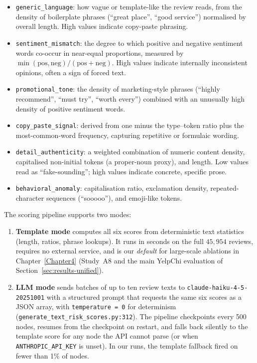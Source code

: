 \begin{itemize}
    \item \texttt{generic\_language}: how vague or template-like the review reads, from the density of boilerplate phrases (``great place'', ``good service'') normalised by overall length. High values indicate copy-paste phrasing.
    \item \texttt{sentiment\_mismatch}: the degree to which positive and negative sentiment words co-occur in near-equal proportions, measured by $\min(\text{pos}, \text{neg}) / (\text{pos} + \text{neg})$. High values indicate internally inconsistent opinions, often a sign of forced text.
    \item \texttt{promotional\_tone}: the density of marketing-style phrases (``highly recommend'', ``must try'', ``worth every'') combined with an unusually high density of positive sentiment words.
    \item \texttt{copy\_paste\_signal}: derived from one minus the type--token ratio plus the most-common-word frequency, capturing repetitive or formulaic wording.
    \item \texttt{detail\_authenticity}: a weighted combination of numeric content density, capitalised non-initial tokens (a proper-noun proxy), and length. Low values read as ``fake-sounding''; high values indicate concrete, specific prose.
    \item \texttt{behavioral\_anomaly}: capitalisation ratio, exclamation density, repeated-character sequences (``sooooo''), and emoji-like tokens.
\end{itemize}

The scoring pipeline supports two modes:

\begin{enumerate}
    \item \textbf{Template mode} computes all six scores from deterministic text statistics (length, ratios, phrase lookups). It runs in seconds on the full $45{,}954$ reviews, requires no external service, and is our \emph{default} for large-scale ablations in Chapter~\ref{Chapter4} (Study~A8 and the main YelpChi evaluation of Section~\ref{sec:results-unified}).
    \item \textbf{LLM mode} sends batches of up to ten review texts to \texttt{claude-haiku-4-5-20251001} with a structured prompt that requests the same six scores as a JSON array, with \texttt{temperature~=~0} for determinism (\texttt{generate\_text\_risk\_scores.py:312}). The pipeline checkpoints every 500 nodes, resumes from the checkpoint on restart, and falls back silently to the template score for any node the API cannot parse (or when \texttt{ANTHROPIC\_API\_KEY} is unset). In our runs, the template fallback fired on fewer than 1\% of nodes.
\end{enumerate}


